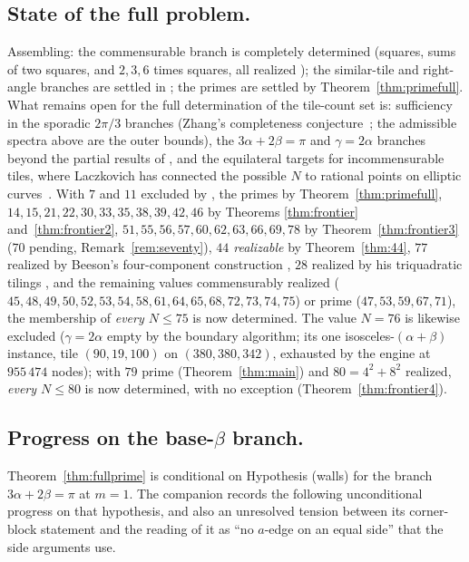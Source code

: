 \documentclass[11pt,reqno]{amsart}
\theoremstyle{plain}
\theoremstyle{definition}
\begin{document}
\subsection*{State of the full problem.}
Assembling: the commensurable branch is completely determined (squares, sums of two squares, and
$2,3,6$ times squares, all realized \cite{BeesonSeven}); the similar-tile and right-angle branches
are settled in \cite{BeesonI, SWW}; the primes are settled by Theorem~\ref{thm:primefull}. What
remains open for the full determination of the tile-count set is: sufficiency in the sporadic
$2\pi/3$ branches (Zhang's completeness conjecture~\cite{Zhang}; the admissible spectra above are
the outer bounds), the $3\alpha+2\beta=\pi$ and $\gamma=2\alpha$ branches beyond the partial
results of \cite{BeesonIII, BeesonIso}, and the equilateral targets for incommensurable tiles,
where Laczkovich has connected the possible $N$ to rational points on elliptic
curves~\cite{LaczkovichEll}. With $7$ and $11$ excluded by \cite{BeesonSeven}, the primes by Theorem~\ref{thm:primefull},
$14,15,21,22,30,33,35,38,39,42,46$ by Theorems \ref{thm:frontier} and~\ref{thm:frontier2},
$51,55,56,57,60,62,63,66,69,78$ by Theorem~\ref{thm:frontier3} ($70$ pending,
Remark~\ref{rem:seventy}), \emph{$44$ realizable} by
Theorem~\ref{thm:44}, $77$ realized by Beeson's four-component construction \cite{BeesonIII},
$28$ realized by his triquadratic tilings \cite{BeesonIII}, and the remaining values
commensurably realized ($45,48,49,50,52,53,54,58,61,64,65,68,72,73,74,75$) or prime
($47,53,59,67,71$), the membership of \emph{every $N\le75$} is now determined. The value $N=76$ is
likewise excluded ($\gamma=2\alpha$ empty by the boundary algorithm; its one
isosceles-$(\alpha{+}\beta)$ instance, tile $(90,19,100)$ on $(380,380,342)$, exhausted by the
engine at $955\,474$ nodes); with $79$ prime (Theorem~\ref{thm:main}) and $80=4^2+8^2$ realized,
\emph{every $N\le80$} is now determined, with no exception (Theorem~\ref{thm:frontier4}).

\subsection*{Progress on the base-$\beta$ branch.}\label{sub:basebetaprogress}
Theorem~\ref{thm:fullprime} is conditional on Hypothesis (walls) for the branch
$3\alpha+2\beta=\pi$ at $m=1$. The companion records the following unconditional
progress on that hypothesis, and also an unresolved tension between its corner-block statement and the
reading of it as ``no $a$-edge on an equal side'' that the side arguments use.
\end{document}
